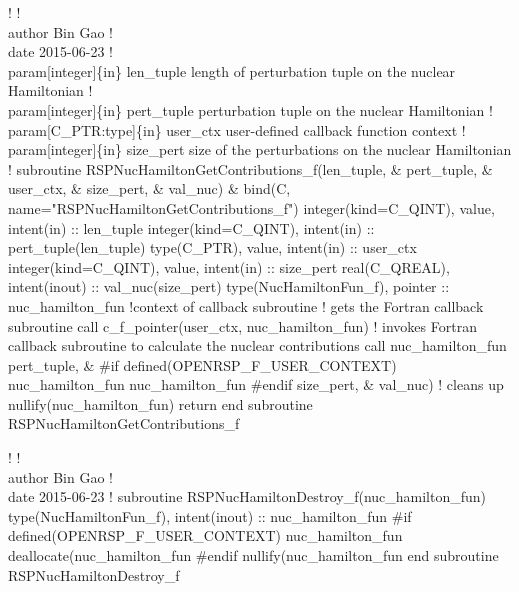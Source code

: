     !%
    !  \\author Bin Gao
    !  \\date 2015-06-23
    !  \\param[integer]\{in\} len_tuple length of perturbation tuple on the nuclear Hamiltonian
    !  \\param[integer]\{in\} pert_tuple perturbation tuple on the nuclear Hamiltonian
    !  \\param[C_PTR:type]\{in\} user_ctx user-defined callback function context
    !  \\param[integer]\{in\} size_pert size of the perturbations on the nuclear Hamiltonian
    !%
    subroutine RSPNucHamiltonGetContributions_f(len_tuple,  &
                                                pert_tuple, &
                                                user_ctx,   &
                                                size_pert,  &
                                                val_nuc)    &
        bind(C, name="RSPNucHamiltonGetContributions_f")
        integer(kind=C_QINT), value, intent(in) :: len_tuple
        integer(kind=C_QINT), intent(in) :: pert_tuple(len_tuple)
        type(C_PTR), value, intent(in) :: user_ctx
        integer(kind=C_QINT), value, intent(in) :: size_pert
        real(C_QREAL), intent(inout) :: val_nuc(size_pert)
        type(NucHamiltonFun_f), pointer :: nuc_hamilton_fun  !context of callback subroutine
        ! gets the Fortran callback subroutine
        call c_f_pointer(user_ctx, nuc_hamilton_fun)
        ! invokes Fortran callback subroutine to calculate the nuclear contributions
        call nuc_hamilton_fun%
                                              pert_tuple,                &
#if defined(OPENRSP_F_USER_CONTEXT)
                                              nuc_hamilton_fun%
                                              nuc_hamilton_fun%
#endif
                                              size_pert,                 &
                                              val_nuc)
        ! cleans up
        nullify(nuc_hamilton_fun)
        return
    end subroutine RSPNucHamiltonGetContributions_f

    !%
    !  \\author Bin Gao
    !  \\date 2015-06-23
    !%
    subroutine RSPNucHamiltonDestroy_f(nuc_hamilton_fun)
        type(NucHamiltonFun_f), intent(inout) :: nuc_hamilton_fun
#if defined(OPENRSP_F_USER_CONTEXT)
        nuc_hamilton_fun%
        deallocate(nuc_hamilton_fun%
#endif
        nullify(nuc_hamilton_fun%
    end subroutine RSPNucHamiltonDestroy_f

